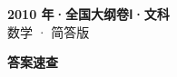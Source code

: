 \documentclass[zihao=-4, a4paper]{ctexart}
\begin{document}
\begin{center}
  {\Large\bfseries 2010 年·全国大纲卷Ⅰ·文科}\\[4pt]
  {\large 数学 · 简答版}
\end{center}
\medskip
{}

\clearpage
{}
\begin{center}{\Large\bfseries 答案速查}\end{center}
\medskip

\end{document}
